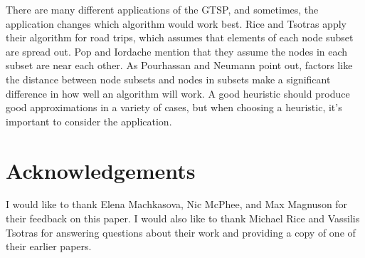 \documentclass{sig-alternate}
\begin{document}
There are many different applications of the GTSP, and sometimes, the application changes which algorithm would work best. Rice and Tsotras \cite{Rice:2013} apply their algorithm for road trips, which assumes that elements of each node subset are spread out. Pop and Iordache \cite{Pop:2011} mention that they assume the nodes in each subset are near each other. As Pourhassan and Neumann \cite {Pourhassan:2015} point out, factors like the distance between node subsets and nodes in subsets make a significant difference in how well an algorithm will work. A good heuristic should produce good approximations in a variety of cases, but when choosing a heuristic, it's important to consider the application. 

\section{Acknowledgements}
I would like to thank Elena Machkasova, Nic McPhee, and Max Magnuson for their feedback on this paper. I would also like to thank Michael Rice and Vassilis Tsotras for answering questions about their work and providing a copy of one of their earlier papers. 


  
\end{document}
